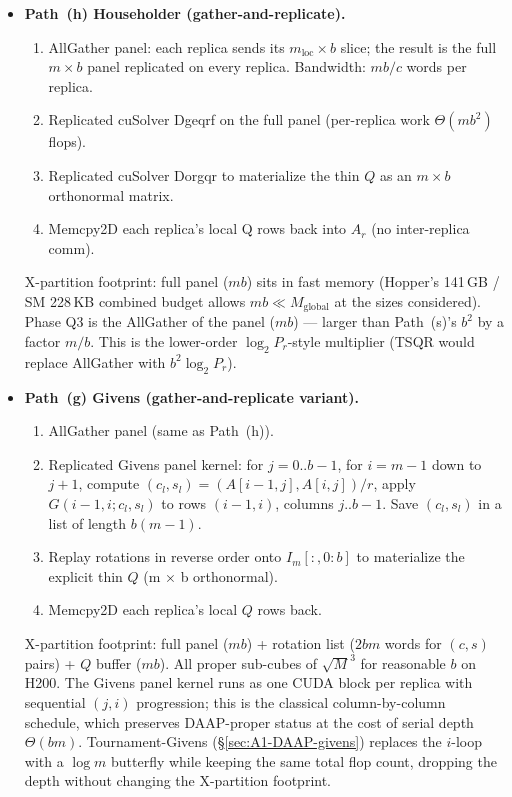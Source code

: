 \documentclass[11pt]{article}
\begin{document}
\begin{itemize}[leftmargin=2em, itemsep=0.4em]
\item \textbf{Path~(h) Householder (gather-and-replicate).}
  \begin{enumerate}[leftmargin=1.5em, label=\textit{(\arabic*)}]
    \item AllGather panel: each replica sends its
          $m_{\mathrm{loc}} \times b$ slice; the result is the full
          $m \times b$ panel replicated on every replica.
          Bandwidth: $m b / c$ words per replica.
    \item Replicated cuSolver Dgeqrf on the full panel
          (per-replica work $\Theta(m b^2)$ flops).
    \item Replicated cuSolver Dorgqr to materialize the thin
          $Q$ as an $m \times b$ orthonormal matrix.
    \item Memcpy2D each replica's local Q rows back into
          $A_r$ (no inter-replica comm).
  \end{enumerate}
  X-partition footprint: full panel ($m b$) sits in fast memory
  (Hopper's 141\,GB / SM 228\,KB combined budget allows $m b
  \ll M_\text{global}$ at the sizes considered).  Phase Q3 is the
  AllGather of the panel ($m b$) --- larger than Path~(s)'s $b^2$ by
  a factor $m/b$.  This is the lower-order $\log_2 P_r$-style
  multiplier (TSQR would replace AllGather with $b^2 \log_2 P_r$).

\item \textbf{Path~(g) Givens (gather-and-replicate variant).}
  \begin{enumerate}[leftmargin=1.5em, label=\textit{(\arabic*)}]
    \item AllGather panel (same as Path~(h)).
    \item Replicated Givens panel kernel: for $j = 0..b{-}1$, for
          $i = m{-}1$ down to $j{+}1$, compute
          $(c_l, s_l) = (A[i{-}1, j], A[i, j])/r$, apply
          $G(i{-}1, i; c_l, s_l)$ to rows $(i{-}1, i)$, columns
          $j..b{-}1$.  Save $(c_l, s_l)$ in a list of length
          $b(m{-}1)$.
    \item Replay rotations in reverse order onto $I_m[:, 0{:}b]$ to
          materialize the explicit thin $Q$ (m × b orthonormal).
    \item Memcpy2D each replica's local $Q$ rows back.
  \end{enumerate}
  X-partition footprint: full panel ($m b$) + rotation list
  ($2 b m$ words for $(c, s)$ pairs) + $Q$ buffer ($m b$).  All proper
  sub-cubes of $\sqrt{M}^3$ for reasonable $b$ on H200.  The Givens
  panel kernel runs as one CUDA block per replica with sequential
  $(j, i)$ progression; this is the classical column-by-column
  schedule, which preserves DAAP-proper status at the cost of
  serial depth $\Theta(b m)$. Tournament-Givens
  (\S\ref{sec:A1-DAAP-givens}) replaces the $i$-loop with a $\log m$
  butterfly while keeping the same total flop count, dropping the
  depth without changing the X-partition footprint.


\end{itemize}
\end{document}

